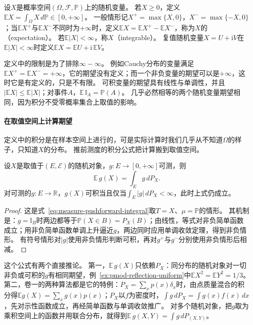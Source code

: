 \begin{definition}[期望]
\label{def:pmod-expectation}
设$X$是概率空间$(\Omega,\mathcal F,\mathbb P)$上的随机变量。
若$X\ge0$，定义$\mathbb E X=\int_\Omega X\,d\mathbb P\in[0,+\infty]$。
一般情形记$X^+=\max\{X,0\}$，$X^-=\max\{-X,0\}$；当$\mathbb EX^+$与$\mathbb EX^-$不同时为$+\infty$时，定义$\mathbb EX=\mathbb EX^+-\mathbb EX^-$，称为$X$的（expectation）。
若$\mathbb E|X|<\infty$，称$X$（integrable）。
复值随机变量$X=U+\mathrm iV$在$\mathbb E|X|<\infty$时定义$\mathbb EX=\mathbb EU+\mathrm i\,\mathbb EV$。
\end{definition}

定义中的限制是为了排除$\infty-\infty$。
例如Cauchy分布的变量满足$\mathbb EX^+=\mathbb EX^-=+\infty$，它的期望没有定义；而一个非负变量的期望可以是$+\infty$，这时它是有定义的，只是不有限。
可积变量的期望具有线性与单调性，并且$|\mathbb EX|\le\mathbb E|X|$；对事件$A$，$\mathbb E\,\mathbb I_A=\mathbb P(A)$。
几乎必然相等的两个随机变量期望相同，因为积分不受零概率集合上取值的影响。

\paragraph{在取值空间上计算期望}
定义中的积分是在样本空间上进行的，可是实际计算时我们几乎从不知道$\Omega$的样子，只知道$X$的分布。
推前测度的积分公式把计算搬到取值空间。

\begin{theorem}[分布积分公式]
\label{thm:pmod-change-of-variables}
设$X$是取值于$(E,\mathcal E)$的随机对象，$g:E\to[0,+\infty]$可测，则
\[
  \mathbb E\,g(X)=\int_Eg\,dP_X.
\]
对可测的$g:E\to\mathbb R$，$g(X)$可积当且仅当$\int_E|g|\,dP_X<\infty$，此时上式仍成立。
\end{theorem}

\begin{proof}
这是式~\eqref{eq:measure-pushforward-integral}取$T=X$、$\mu=\mathbb P$的情形。
其机制是：$g=\mathbb I_B$时两边都等于$\mathbb P(X\in B)=P_X(B)$；由线性，等式对非负简单函数成立；用非负简单函数单调上升逼近$g$，两边同时应用单调收敛定理，得到非负情形。
有符号情形对$|g|$使用非负情形判断可积，再对$g^+$与$g^-$分别使用非负情形后相减。
\end{proof}

这个公式有两个直接推论。
第一，$\mathbb E\,g(X)$只依赖$P_X$：同分布的随机对象对一切非负或可积的$g$有相同期望，例~\ref{ex:pmod-reflection-uniform}中$\mathbb EX^2=\mathbb EY^2=1/3$。
第二，卷一的两种算法都是它的特例：$P_X=\sum_xp(x)\delta_x$时，由点质量混合的积分得$\mathbb Eg(X)=\sum_xg(x)p(x)$；$P_X$以$f$为密度时，$\int g\,dP_X=\int g(x)f(x)\,dx$，先对示性函数成立，再经简单函数与单调收敛推广。
对多个随机对象，把$g$取为乘积空间上的函数并用联合分布，就得到$\mathbb E\,g(X,Y)=\int g\,dP_{(X,Y)}$。

